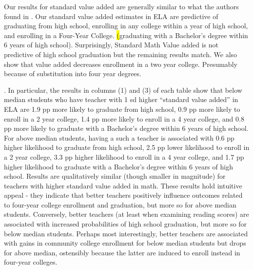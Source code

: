 \documentclass{article}
\theoremstyle{definition}
\theoremstyle{definition}
\theoremstyle{definition}
\theoremstyle{definition}
\begin{document}
    
    Our results for standard value added are generally similar to what the authors found in \cite{chetty2014measuring2}. Our standard value added estimates in ELA are predictive of graduating from high school, enrolling in any college within a year of high school, and  enrolling in a Four-Year College. \hl(graduating with a Bachelor's degree within 6 years of high school). Surprisingly, Standard Math Value added is not predictive of high school graduation but the remaining results match. We also show that value added decreases enrollment in a two year college. Presumably because of substitution into four year degrees. 




. In particular, the results in columns (1) and (3) of each table show that below median students who have teacher with 1 sd higher “standard value added” in ELA are 1.9 pp more likely to graduate from high school, 0.9 pp more likely to enroll in a 2 year college, 1.4 pp more likely to enroll in a 4 year college, and 0.8 pp more likely to graduate with a Bachelor's degree within 6 years of high school. For above median students, having a such a teacher is associated with 0.6 pp higher likelihood to graduate from high school, 2.5 pp lower likelihood to enroll in a 2 year college, 3.3 pp higher likelihood to enroll in a 4 year college, and 1.7 pp higher likelihood to graduate with a Bachelor's degree within 6 years of high school. Results are qualitatively similar (though smaller in magnitude) for teachers with higher standard value added in math. These results hold intuitive appeal - they indicate that better teachers positively influence outcomes related to four-year college enrollment and graduation, but more so for above median students.  Conversely, better teachers (at least when examining reading scores) are associated with increased probabilities of high school graduation, but more so for below median students.  Perhaps most interestingly, better teachers are associated with gains in community college enrollment for below median students but drops for above median, ostensibly because the latter are induced to enroll instead in four-year colleges.  
\end{document}
